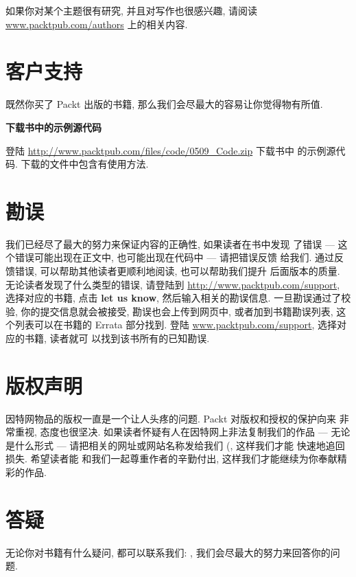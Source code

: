 如果你对某个主题很有研究, 并且对写作也很感兴趣, 请阅读
\url{www.packtpub.com/authors} 上的相关内容.

\section*{客户支持}
\label{sec:customer_support}
既然你买了 Packt 出版的书籍, 那么我们会尽最大的容易让你觉得物有所值.
\begin{warning}
    \textbf{下载书中的示例源代码}

    登陆 \url{http://www.packtpub.com/files/code/0509_Code.zip} 下载书中 
    的示例源代码. 下载的文件中包含有使用方法.
\end{warning}

\section*{勘误}
\label{sec:errata}

我们已经尽了最大的努力来保证内容的正确性, 如果读者在书中发现
了错误 --- 这个错误可能出现在正文中, 也可能出现在代码中 --- 请把错误反馈
给我们. 通过反馈错误, 可以帮助其他读者更顺利地阅读, 也可以帮助我们提升
后面版本的质量. 无论读者发现了什么类型的错误, 请登陆到
\url{http://www.packtpub.com/support}, 选择对应的书籍, 点击 \textbf{let us
know}, 然后输入相关的勘误信息. 一旦勘误通过了校验, 你的提交信息就会被接受, 
勘误也会上传到网页中, 或者加到书籍勘误列表, 这个列表可以在书籍的 Errata 
部分找到. 登陆 \url{www.packtpub.com/support}, 选择对应的书籍, 读者就可
以找到该书所有的已知勘误.

\section*{版权声明}
\label{sec:piracy}

因特网物品的版权一直是一个让人头疼的问题. Packt 对版权和授权的保护向来
非常重视, 态度也很坚决. 如果读者怀疑有人在因特网上非法复制我们的作品 ---
无论是什么形式 --- 请把相关的网址或网站名称发给我们
(, 这样我们才能 快速地追回损失. 希望读者能
和我们一起尊重作者的辛勤付出, 这样我们才能继续为你奉献精彩的作品.

\section*{答疑}
\label{sec:questions}
无论你对书籍有什么疑问, 都可以联系我们: ,
我们会尽最大的努力来回答你的问题.

